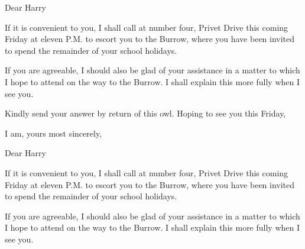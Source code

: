 \documentclass[11pt]{IFSCommunication}
\begin{document}


Dear Harry

If it is convenient to you, I shall call at number four, Privet Drive this coming Friday at eleven P.M. to escort you to the Burrow, where you have been invited to spend the remainder of your school holidays.

If you are agreeable, I should also be glad of your assistance in a matter to which I hope to attend on the way to the Burrow. I shall explain this more fully when I see you.

Kindly send your answer by return of this owl. Hoping to see you this Friday,

\closing[t]{I am, yours most sincerely,}

\clearpage






Dear Harry

If it is convenient to you, I shall call at number four, Privet Drive this coming Friday at eleven P.M. to escort you to the Burrow, where you have been invited to spend the remainder of your school holidays.

If you are agreeable, I should also be glad of your assistance in a matter to which I hope to attend on the way to the Burrow. I shall explain this more fully when I see you.
\end{document}
